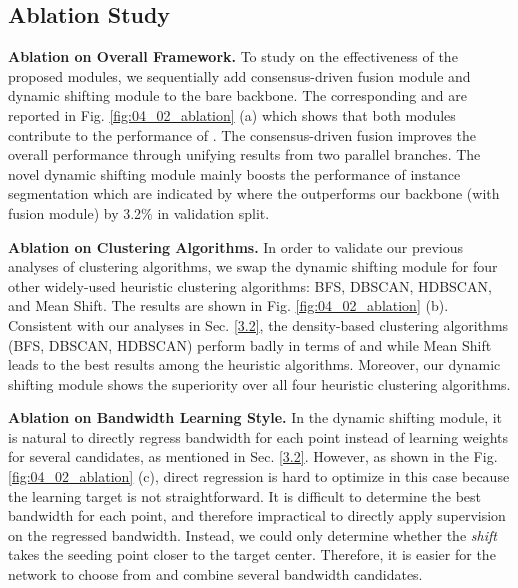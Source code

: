 \documentclass[final]{cvpr}
\begin{document}
 
\subsection{Ablation Study}\label{ablation}




\noindent\textbf{Ablation on Overall Framework.}
To study on the effectiveness of the proposed modules, we sequentially add consensus-driven fusion
module and dynamic shifting module to the bare backbone.
The corresponding \PQ{} and \PQth{} are reported in Fig. \ref{fig:04_02_ablation} (a) which shows
that both modules contribute to the performance of \nickname{}.
The consensus-driven fusion improves the overall performance through unifying results from two parallel branches.
The novel dynamic shifting module mainly boosts the performance of instance segmentation which are indicated by
\PQth{} where the \nickname{} outperforms our backbone (with fusion module) by 3.2\% in validation split.

\noindent\textbf{Ablation on Clustering Algorithms.}
In order to validate our previous analyses of clustering algorithms, we swap the dynamic shifting module for four
other widely-used heuristic clustering algorithms: BFS, DBSCAN, HDBSCAN, and Mean Shift.
The results are shown in Fig. \ref{fig:04_02_ablation} (b).
Consistent with our analyses in Sec. \ref{3.2}, the density-based clustering algorithms (\eg BFS, DBSCAN, HDBSCAN)
perform badly in terms of \PQ{} and \PQth{} while Mean Shift leads to the best results among the heuristic algorithms.
Moreover, our dynamic shifting module shows the superiority over all four heuristic clustering algorithms.

\noindent\textbf{Ablation on Bandwidth Learning Style.}
In the dynamic shifting module, it is natural to directly regress bandwidth for each point
instead of learning weights for several candidates, as mentioned in Sec. \ref{3.2}.
However, as shown in the Fig. \ref{fig:04_02_ablation} (c), direct regression is hard to optimize in this
case because the learning target is not straightforward.
It is difficult to determine the best bandwidth for each point, and therefore impractical to directly apply supervision
on the regressed bandwidth.
Instead, we could only determine whether the \textit{shift} takes the seeding point closer to the target
center.
Therefore, it is easier for the network to choose from and combine several bandwidth candidates.
\end{document}
